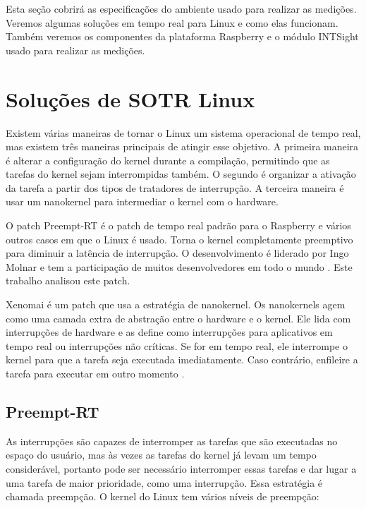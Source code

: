 
Esta seção cobrirá as especificações do ambiente usado para realizar as medições. Veremos algumas soluções em tempo real para Linux e como elas funcionam. Também veremos os componentes da plataforma Raspberry e o módulo INTSight usado para realizar as medições.

\section{Soluções de SOTR Linux}

Existem várias maneiras de tornar o Linux um sistema operacional de tempo real, mas existem três maneiras principais de atingir esse objetivo. A primeira maneira é alterar a configuração do kernel durante a compilação, permitindo que as tarefas do kernel sejam interrompidas também. O segundo é organizar a ativação da tarefa a partir dos tipos de tratadores de interrupção. A terceira maneira é usar um nanokernel para intermediar o kernel com o hardware.

O patch Preempt-RT é o patch de tempo real padrão para o Raspberry e vários outros casos em que o Linux é usado. Torna o kernel completamente preemptivo para diminuir a latência de interrupção. O desenvolvimento é liderado por Ingo Molnar e tem a participação de muitos desenvolvedores em todo o mundo \cite{McKenney2005, Molnar2016}. Este trabalho analisou este patch.

Xenomai é um patch que usa a estratégia de nanokernel. Os nanokernels agem como uma camada extra de abstração entre o hardware e o kernel. Ele lida com interrupções de hardware e as define como interrupções para aplicativos em tempo real ou interrupções não críticas. Se for em tempo real, ele interrompe o kernel para que a tarefa seja executada imediatamente. Caso contrário, enfileire a tarefa para executar em outro momento \cite{Xenomai2005}.

\subsection{Preempt-RT}

As interrupções são capazes de interromper as tarefas que são executadas no espaço do usuário, mas às vezes as tarefas do kernel já levam um tempo considerável, portanto pode ser necessário interromper essas tarefas e dar lugar a uma tarefa de maior prioridade, como uma interrupção. Essa estratégia é chamada preempção. O kernel do Linux tem vários níveis de preempção:

